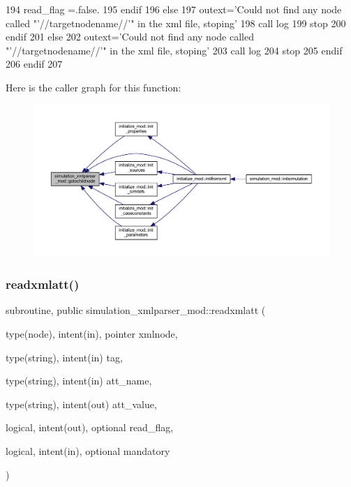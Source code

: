 \begin{DoxyCode}
194               read\_flag =.false.
195 \textcolor{keywordflow}{            endif}
196           \textcolor{keywordflow}{else}
197             outext=\textcolor{stringliteral}{'Could not find any node called "'}//targetnodename//\textcolor{stringliteral}{'" in the xml file, stoping'}
198             \textcolor{keyword}{call }log%
199             stop
200 \textcolor{keywordflow}{          endif}
201         \textcolor{keywordflow}{else}
202           outext=\textcolor{stringliteral}{'Could not find any node called "'}//targetnodename//\textcolor{stringliteral}{'" in the xml file, stoping'}
203           \textcolor{keyword}{call }log%
204           stop
205 \textcolor{keywordflow}{        endif}
206 \textcolor{keywordflow}{    endif}
207 
\end{DoxyCode}
Here is the caller graph for this function\+:\nopagebreak
\begin{figure}[H]
\begin{center}
\leavevmode
\includegraphics[width=350pt]{namespacesimulation__xmlparser__mod_a3167fcb99b40cdc25d2ba18418bd8b9f_icgraph}
\end{center}
\end{figure}
\mbox{\label{namespacesimulation__xmlparser__mod_ab062c8e064b043446d4f6ac695b306ab}} 
\subsubsection{\texorpdfstring{readxmlatt()}{readxmlatt()}}
{\footnotesize\ttfamily subroutine, public simulation\+\_\+xmlparser\+\_\+mod\+::readxmlatt (\begin{DoxyParamCaption}\item[{type(node), intent(in), pointer}]{xmlnode,  }\item[{type(string), intent(in)}]{tag,  }\item[{type(string), intent(in)}]{att\+\_\+name,  }\item[{type(string), intent(out)}]{att\+\_\+value,  }\item[{logical, intent(out), optional}]{read\+\_\+flag,  }\item[{logical, intent(in), optional}]{mandatory }\end{DoxyParamCaption})}



